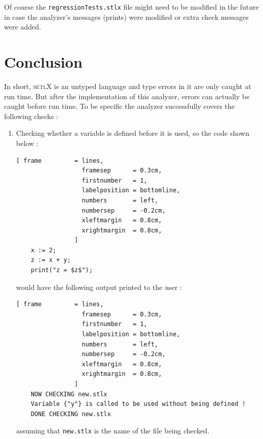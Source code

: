 \documentclass[11pt]{report}
\begin{document}
Of course the \texttt{regressionTests.stlx} file might need to be modified in the future in case the analyzer's messages (prints) were modified or extra check messages were added.

\chapter{Conclusion}

In short, \textsc{setlX} is an untyped language and type errors in it are only caught at run time. But after the implementation of this analyzer, errors can actually be caught before run time. To be specific the analyzer successfully covers the following checks :
\begin{enumerate}
\item Checking whether a variable is defined before it is used, so the code shown below :
\begin{Verbatim}[ frame         = lines, 
                  framesep      = 0.3cm, 
                  firstnumber   = 1,
                  labelposition = bottomline,
                  numbers       = left,
                  numbersep     = -0.2cm,
                  xleftmargin   = 0.8cm,
                  xrightmargin  = 0.8cm,
                ]
    x := 2;
    z := x + y;
    print("z = $z$");
\end{Verbatim}
would have the following output printed to the user :
\begin{Verbatim}[ frame         = lines, 
                  framesep      = 0.3cm, 
                  firstnumber   = 1,
                  labelposition = bottomline,
                  numbers       = left,
                  numbersep     = -0.2cm,
                  xleftmargin   = 0.8cm,
                  xrightmargin  = 0.8cm,
                ]
    NOW CHECKING new.stlx
    Variable {"y"} is called to be used without being defined !
    DONE CHECKING new.stlx
\end{Verbatim}
assuming that \texttt{new.stlx} is the name of the file being checked.


\end{enumerate}
\end{document}
